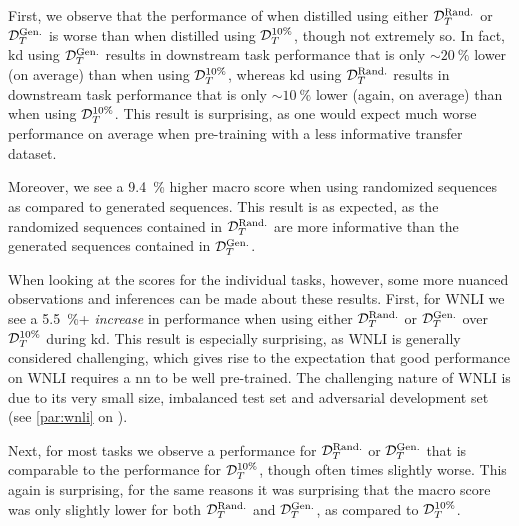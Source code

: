 First, we observe that the performance of \bertstudent when distilled using either $\mathcal{D}_T^{\text{Rand.}}$ or $\mathcal{D}_T^{\text{Gen.}}$ is worse than when distilled using $\mathcal{D}_T^{10\%}$, though not extremely so. In fact, \gls{kd} using $\mathcal{D}_T^{\text{Gen.}}$ results in downstream task performance that is only $\sim \SI{20}{\percent}$ lower (on average) than when using $\mathcal{D}_T^{10\%}$, whereas \gls{kd} using $\mathcal{D}_T^{\text{Rand.}}$ results in downstream task performance that is only $\sim \SI{10}{\percent}$ lower (again, on average) than when using $\mathcal{D}_T^{10\%}$. This result is surprising, as one would expect much worse performance on average when pre-training with a less informative transfer dataset.

Moreover, we see a \SI{9.4}{\percent} higher macro score when using randomized sequences as compared to generated sequences. This result is as expected, as the randomized sequences contained in $\mathcal{D}_T^{\text{Rand.}}$ are more informative than the generated sequences contained in $\mathcal{D}_T^{\text{Gen.}}$.

When looking at the scores for the individual tasks, however, some more nuanced observations and inferences can be made about these results. First, for WNLI we see a \SI{5.5}{\percent}+ \emph{increase} in performance when using either $\mathcal{D}_T^{\text{Rand.}}$ or $\mathcal{D}_T^{\text{Gen.}}$ over $\mathcal{D}_T^{10\%}$ during \gls{kd}. This result is especially surprising, as WNLI is generally considered challenging, which gives rise to the expectation that good performance on WNLI requires a \gls{nn} to be well pre-trained. The challenging nature of WNLI is due to its very small size, imbalanced test set and adversarial development set (see \cref{par:wnli} on ). 

Next, for most tasks we observe a performance for $\mathcal{D}_T^{\text{Rand.}}$ or $\mathcal{D}_T^{\text{Gen.}}$ that is comparable to the performance for $\mathcal{D}_T^{10\%}$, though often times slightly worse. This again is surprising, for the same reasons it was surprising that the macro score was only slightly lower for both $\mathcal{D}_T^{\text{Rand.}}$ and $\mathcal{D}_T^{\text{Gen.}}$, as compared to $\mathcal{D}_T^{10\%}$.

